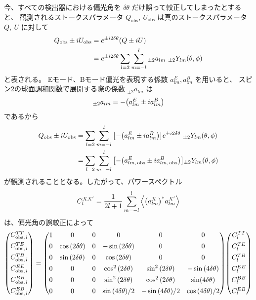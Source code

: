 \documentclass[../../main.tex]{subfiles}
\begin{document}
今、すべての検出器における偏光角を $\delta \theta$ だけ誤って較正してしまったとすると、
観測されるストークスパラメータ $Q_{\mathrm{obs}},\ U_{\mathrm{obs}}$ は真のストークスパラメータ $Q,\ U$ に対して
\begin{align}
    Q_{\mathrm{obs}} \pm iU_{\mathrm{obs}} &= e^{\pm i2\delta\theta}\qty(Q \pm iU) \\
    &= e^{\pm i2\delta\theta}\sum_{l=2}\sum_{m=-l}^{l} {}_{\pm 2}a_{lm}\ {}_{\pm 2}Y_{lm}(\theta, \phi)
\end{align}
と表される。\cite{so:Keating_2013}\cite{so:Kaufman_2014}
Eモード、Bモード偏光を表現する係数 $a_{lm}^{E}, a_{lm}^{B}$ を用いると、
スピン2の球面調和関数で展開する際の係数 ${}_{\pm 2}a_{lm}$ は
\begin{equation}
    {}_{\pm 2}a_{lm} = -\qty(a_{lm}^{E} \pm i a_{lm}^{B})
\end{equation}
であるから
\begin{align}
    Q_{\mathrm{obs}} \pm iU_{\mathrm{obs}} &= \sum_{l=2}\sum_{m=-l}^{l} \qty[-\qty(a_{lm}^{E} \pm i a_{lm}^{B})]e^{\pm i2\delta\theta}\ {}_{\pm 2}Y_{lm}(\theta, \phi) \\
    &= \sum_{l=2}\sum_{m=-l}^{l} \qty[-\qty(a_{lm,\,\mathrm{obs}}^{E} \pm i a_{lm,\,\mathrm{obs}}^{B})] {}_{\pm2}Y_{lm}(\theta, \phi)
\end{align}
が観測されることとなる。したがって、パワースペクトル
\begin{equation}
    C_{l}^{XX'} = \dfrac{1}{2l+1}\sum_{m=-l}^{l}\left\langle \qty(a_{lm}^{X})^{*} a_{lm}^{X'} \right\rangle
\end{equation}
は、偏光角の誤較正によって
\begin{equation}
    \mqty( C_{\mathrm{obs},\,l}^{TT} \\[1ex]
           C_{\mathrm{obs},\,l}^{TE} \\[1ex]
           C_{\mathrm{obs},\,l}^{TB} \\[1ex]
           C_{\mathrm{obs},\,l}^{EE} \\[1ex]
           C_{\mathrm{obs},\,l}^{BB} \\[1ex]
           C_{\mathrm{obs},\,l}^{EB} )
    = \mqty( 1 & 0 & 0 & 0 & 0 & 0 \\[1ex]
             0 & \cos\qty(2\delta\theta) & 0 & -\sin\qty(2\delta\theta) & 0 & 0 \\[1ex]
             0 & \sin\qty(2\delta\theta) & 0 & \cos\qty(2\delta\theta) & 0 & 0 \\[1ex]
             0 & 0 & 0 & \cos^2\qty(2\delta\theta) & \sin^2\qty(2\delta\theta) & -\sin\qty(4\delta\theta) \\[1ex]
             0 & 0 & 0 & \sin^2\qty(2\delta\theta) & \cos^2\qty(2\delta\theta) & \sin(4\delta\theta) \\[1ex]
             0 & 0 & 0 & \sin\qty(4\delta\theta)/2 & -\sin\qty(4\delta\theta)/2 & \cos\qty(4\delta\theta)/2 )
    \mqty( C_{l}^{TT} \\[1ex]
              C_{l}^{TE} \\[1ex]
              C_{l}^{TB} \\[1ex]
              C_{l}^{EE} \\[1ex]
              C_{l}^{BB} \\[1ex]
              C_{l}^{EB} )
\end{equation}
\end{document}
